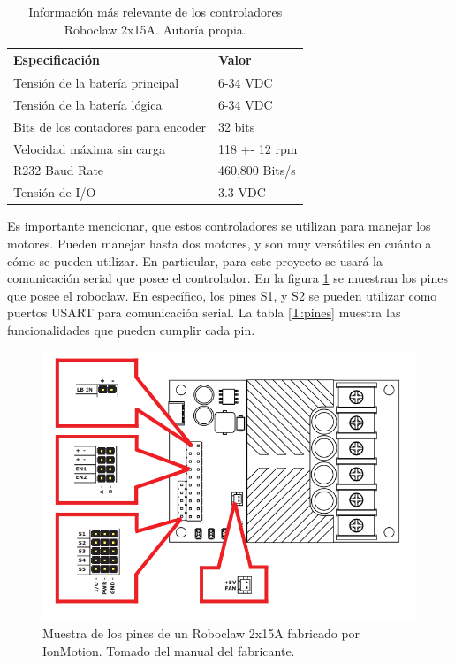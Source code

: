 \begin{table}[H]
\caption{Información más relevante de los controladores Roboclaw 2x15A. Autoría propia.}
\begin{tabular}{|l|l|}
\hline
Especificación                      & Valor          \\ \hline
Tensión de la batería principal     & 6-34 VDC       \\ \hline
Tensión de la batería lógica        & 6-34 VDC       \\ \hline
Bits de los contadores para encoder & 32 bits        \\ \hline
Velocidad máxima sin carga          & 118 +- 12 rpm  \\ \hline
R232 Baud Rate                      & 460,800 Bits/s \\ \hline
Tensión de I/O                      & 3.3 VDC        \\ \hline
\end{tabular}
\label{T:roboclaw}
\end{table}

Es importante mencionar, que estos controladores se utilizan para manejar los motores. Pueden manejar hasta dos motores, y son muy versátiles en cuánto a cómo se pueden utilizar. En particular, para este proyecto se usará la comunicación serial que posee el controlador. En la figura \ref{F:roboclaw} se muestran los pines que posee el roboclaw. En específico, los pines S1, y S2 se pueden utilizar como puertos USART para comunicación serial. La tabla \ref{T:pines} muestra las funcionalidades que pueden cumplir cada pin.

\begin{figure}[H]
\centering
\includegraphics[scale=0.5]{imagenes/roboclaw.png}
\caption{Muestra de los pines de un Roboclaw 2x15A fabricado por IonMotion. Tomado del manual del fabricante.}
\label{F:roboclaw}
\end{figure}

